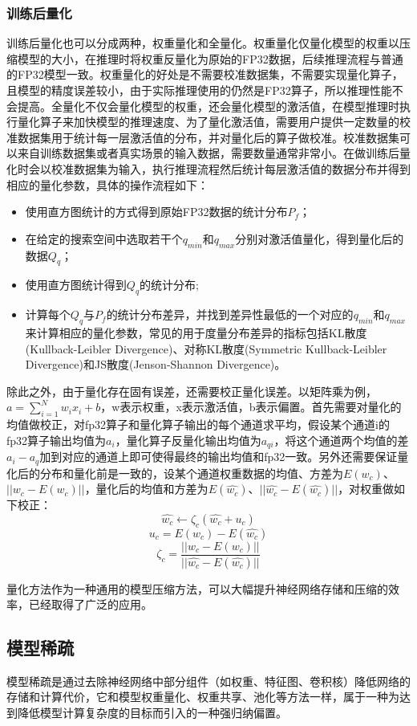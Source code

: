 \subsubsection{训练后量化}

训练后量化也可以分成两种，权重量化和全量化。权重量化仅量化模型的权重以压缩模型的大小，在推理时将权重反量化为原始的FP32数据，后续推理流程与普通的FP32模型一致。权重量化的好处是不需要校准数据集，不需要实现量化算子，且模型的精度误差较小，由于实际推理使用的仍然是FP32算子，所以推理性能不会提高。全量化不仅会量化模型的权重，还会量化模型的激活值，在模型推理时执行量化算子来加快模型的推理速度、为了量化激活值，需要用户提供一定数量的校准数据集用于统计每一层激活值的分布，并对量化后的算子做校准。校准数据集可以来自训练数据集或者真实场景的输入数据，需要数量通常非常小。在做训练后量化时会以校准数据集为输入，执行推理流程然后统计每层激活值的数据分布并得到相应的量化参数，具体的操作流程如下：
 \begin{itemize}
    \item 使用直方图统计的方式得到原始FP32数据的统计分布$P_f$；
    \item 在给定的搜索空间中选取若干个$q_{min}$和$q_{max}$分别对激活值量化，得到量化后的数据$Q_q$；
    \item 使用直方图统计得到$Q_q$的统计分布;
    \item 计算每个$Q_q$与$P_f$的统计分布差异，并找到差异性最低的一个对应的$q_{min}$和$q_{max}$来计算相应的量化参数，常见的用于度量分布差异的指标包括KL散度(Kullback-Leibler Divergence)、对称KL散度(Symmetric Kullback-Leibler Divergence)和JS散度(Jenson-Shannon Divergence)。
 \end{itemize}
 
  除此之外，由于量化存在固有误差，还需要校正量化误差。以矩阵乘为例，$a=\sum_{i=1}^Nw_ix_i+b$，w表示权重，x表示激活值，b表示偏置。首先需要对量化的均值做校正，对fp32算子和量化算子输出的每个通道求平均，假设某个通道i的fp32算子输出均值为$a_i$，量化算子反量化输出均值为$a_{qi}$，将这个通道两个均值的差$a_i-a_q$加到对应的通道上即可使得最终的输出均值和fp32一致。另外还需要保证量化后的分布和量化前是一致的，设某个通道权重数据的均值、方差为$E(w_c)$、$||w_c-E(w_c)||$，量化后的均值和方差为$E(\hat{w_c})$、$||\hat{w_c}-E(\hat{w_c})||$，对权重做如下校正：
        $$\hat{w_c}\leftarrow\zeta_c(\hat{w_c}+u_c)$$
        $$u_c=E(w_c)-E(\hat{w_c})$$
        $$\zeta_c=\frac{||w_c-E(w_c)||}{||\hat{w_c}-E(\hat{w_c})||}$$

 量化方法作为一种通用的模型压缩方法，可以大幅提升神经网络存储和压缩的效率，已经取得了广泛的应用。

\subsection{模型稀疏}
模型稀疏是通过去除神经网络中部分组件（如权重、特征图、卷积核）降低网络的存储和计算代价，它和模型权重量化、权重共享、池化等方法一样，属于一种为达到降低模型计算复杂度的目标而引入的一种强归纳偏置。
